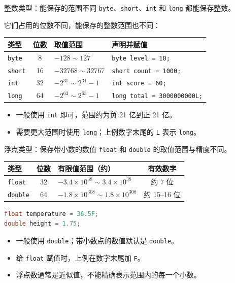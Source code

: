 \documentclass[aspectratio=169]{beamer}
\begin{document}
\begin{frame}[fragile]{整数类型：能保存的范围不同}
  \texttt{byte}、\texttt{short}、\texttt{int} 和 \texttt{long} 都能保存整数。
  \par\medskip
  它们占用的位数不同，能保存的整数范围也不同：
  \begin{center}
    \renewcommand{\arraystretch}{1.4}
    \begin{tabular}{lcll}
      \textbf{类型} & \textbf{位数} & \textbf{取值范围} & \textbf{声明并赋值} \\
      \hline
      \texttt{byte} & 8 & $-128 \sim 127$ & \texttt{byte level = 10;} \\
      \texttt{short} & 16 & $-32768 \sim 32767$ & \texttt{short count = 1000;} \\
      \texttt{int} & 32 & $-2^{31} \sim 2^{31}-1$ & \texttt{int score = 60;} \\
      \texttt{long} & 64 & $-2^{63} \sim 2^{63}-1$ & \texttt{long total = 3000000000L;} \\
    \end{tabular}
  \end{center}
  \medskip
  \begin{itemize}
    \item 一般使用 \texttt{int} 即可，范围约为负 21 亿到正 21 亿。
    \item 需要更大范围时使用 \texttt{long}；上例数字末尾的 \texttt{L} 表示 \texttt{long}。
  \end{itemize}
\end{frame}

\begin{frame}[fragile]{浮点类型：保存带小数的数值}
  \texttt{float} 和 \texttt{double} 的取值范围与精度不同。
  \begin{center}
    \renewcommand{\arraystretch}{1.4}
    \begin{tabular}{lclc}
      \textbf{类型} & \textbf{位数} & \textbf{有限值范围（约）} & \textbf{有效数字} \\
      \hline
      \texttt{float} & 32 & $-3.4\times10^{38} \sim 3.4\times10^{38}$ & 约 7 位 \\
      \texttt{double} & 64 & $-1.8\times10^{308} \sim 1.8\times10^{308}$ & 约 15--16 位 \\
    \end{tabular}
  \end{center}
  \begin{lstlisting}[language=Java]
float temperature = 36.5F;
double height = 1.75;
  \end{lstlisting}
  \begin{itemize}
    \item 一般使用 \texttt{double}；带小数点的数值默认是 \texttt{double}。
    \item 给 \texttt{float} 赋值时，上例在数字末尾加 \texttt{F}。
    \item 浮点数通常是近似值，不能精确表示范围内的每一个小数。
  \end{itemize}
\end{frame}
\end{document}

